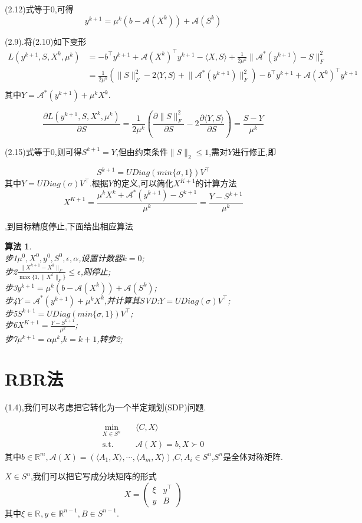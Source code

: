 \documentclass[UTF8]{ctexart}
\newtheorem{algo}{算法}
\newcommand{\s}{\quad}
\newcommand{\p}{\paragraph{}\s}
\newcommand{\sect}{\section}
\newcommand{\equSplit}[1]{\begin{equation}\begin{split}#1\end{split}\end{equation}}
\newcommand{\equ}[1]{\begin{equation}#1\end{equation}}
\newcommand{\Tst}{\text{s.t.}\s}
\newcommand{\norm}[1]{\lVert#1\rVert}
\newcommand{\inprod}[1]{\langle#1\rangle}
\newcommand{\Real}[1]{\mathbb{R}^{#1}}
\newcommand{\Ma}{\mathcal{A}}
\newcommand{\partD}[2]{\frac{\partial#1}{\partial#2}}
\newcommand{\pMa}[1]{\begin{pmatrix}#1\end{pmatrix}}
\numberwithin{equation}{section}
\begin{document}
(2.12)式等于0,可得
\equ{y^{k+1}=\mu^k(b-\Ma(X^k))+\Ma(S^k)}

(2.9).将(2.10)如下变形
\equSplit{
	L(y^{k+1},S,X^k,\mu^k)&=-b^\top y^{k+1}+\Ma(X^k)^\top y^{k+1}-\inprod{X,S}+\frac{1}{2\mu^k}\norm{\Ma^*(y^{k+1})-S}^2_F\\
	&=\frac{1}{2\mu^k}(\norm{S}_F^2-2\inprod{Y,S}+\norm{\Ma^*(y^{k+1})}_F^2)-b^\top y^{k+1}+\Ma(X^k)^\top y^{k+1}\\
}
其中$Y=\Ma^*(y^{k+1})+\mu^kX^k$.

\equ{
	\partD{L(y^{k+1},S,X^k,\mu^k)}{S}=\frac{1}{2\mu^k}(\partD{\norm{S}_F^2}{S}-2\partD{\inprod{Y,S}}{S})=\frac{S-Y}{\mu^k}
}

(2.15)式等于0,则可得$S^{k+1}=Y$,但由约束条件$\norm{S}_2\leq1$,需对$Y$进行修正,即

\equ{S^{k+1}=UDiag(min\{\sigma,1\})V^\top}
其中$Y=UDiag(\sigma)V^\top$.根据$Y$的定义,可以简化$X^{K+1}$的计算方法
\equ{X^{K+1}=\frac{\mu^kX^k+\Ma^*(y^{k+1})-S^{k+1}}{\mu^k}=\frac{Y-S^{k+1}}{\mu^k}}

,到目标精度停止,下面给出相应算法

\begin{algo}
	\s\\
	步1$\mu^0,X^0,y^0,S^0,\epsilon,\alpha$,设置计数器$k=0$;\\
	步2$\frac{\norm{X^{k+1}-X^k}_F}{\max\{1,\norm{X^k}_F\}}\leq\epsilon$,则停止;\\
	步3$y^{k+1}=\mu^k(b-\Ma(X^k))+\Ma(S^k)$;\\
	步4$Y=\Ma^*(y^{k+1})+\mu^kX^k$,并计算其SVD:$Y=UDiag(\sigma)V^\top$;\\
	步5$S^{k+1}=UDiag(min\{\sigma,1\})V^\top$;\\
	步6$X^{K+1}=\frac{Y-S^{k+1}}{\mu^k}$;\\
	步7$\mu^{k+1}=\alpha\mu^k$,$k=k+1$,转步2;
\end{algo}

\sect{RBR法}
(1.4),我们可以考虑把它转化为一个半定规划(SDP)问题.

\equSplit{
	\min_{X\in S^n}\s&\inprod{C,X}\\
	\Tst&\Ma(X)=b,X\succ0}
其中$b\in\Real{m},\Ma(X)=(\inprod{A_1,X},\cdots,\inprod{A_m,X})$,$C,A_i\in S^n$,$S^n$是全体对称矩阵.

$X\in S^n$,我们可以把它写成分块矩阵的形式
\equ{
	X=\pMa{\xi&y^\top\\ y&B}
}
其中$\xi\in\Real{},y\in\Real{n-1},B\in S^{n-1}$.
\end{document}
